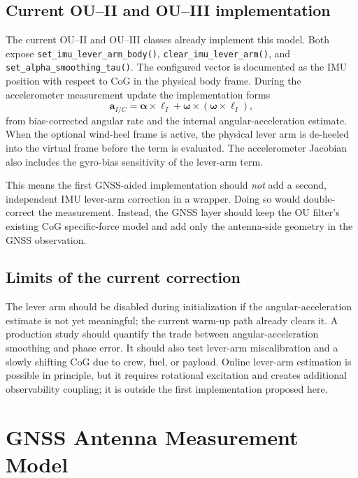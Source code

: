 \documentclass[conference]{IEEEtran}
\DeclareRobustCommand{\vct}[1]{\bm{#1}}
\begin{document}
\subsection{Current OU--II and OU--III implementation}

The current OU--II and OU--III classes already implement this model.  Both expose
\texttt{set\_imu\_lever\_arm\_body()},
\texttt{clear\_imu\_lever\_arm()}, and
\texttt{set\_alpha\_smoothing\_tau()}.  The configured vector is documented as the
IMU position with respect to CoG in the physical body frame.  During the accelerometer
measurement update the implementation forms
\begin{equation}
\vct a_{I/C}
=\vct\alpha\times\vct\ell_I
 +\vct\omega\times(\vct\omega\times\vct\ell_I),
\label{eq:repo-imu-lever}
\end{equation}
from bias-corrected angular rate and the internal angular-acceleration estimate.  When
the optional wind-heel frame is active, the physical lever arm is de-heeled into the
virtual frame before the term is evaluated.  The accelerometer Jacobian also includes
the gyro-bias sensitivity of the lever-arm term.

This means the first GNSS-aided implementation should \emph{not} add a second,
independent IMU lever-arm correction in a wrapper.  Doing so would double-correct the
measurement.  Instead, the GNSS layer should keep the OU filter's existing CoG
specific-force model and add only the antenna-side geometry in the GNSS observation.

\subsection{Limits of the current correction}

The lever arm should be disabled during initialization if the angular-acceleration
estimate is not yet meaningful; the current warm-up path already clears it.  A
production study should quantify the trade between angular-acceleration smoothing and
phase error.  It should also test lever-arm miscalibration and a slowly shifting CoG
due to crew, fuel, or payload.  Online lever-arm estimation is possible in principle,
but it requires rotational excitation and creates additional observability coupling;
it is outside the first implementation proposed here.

\section{GNSS Antenna Measurement Model}
\label{sec:gnss-measurement}
\end{document}
